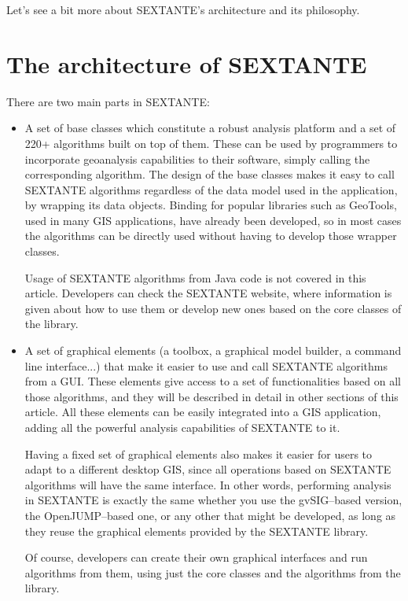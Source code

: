 \documentclass[12pt,a4paper,twocolumn]{article}
\begin{document}
Let's see a bit more about SEXTANTE's architecture and its philosophy.

\section{The architecture of SEXTANTE}

There are two main parts in SEXTANTE:

\begin{itemize}
 \item A set of base classes which constitute a robust analysis platform and a set of 220+ algorithms built on top of them. These can be used by programmers to incorporate geoanalysis capabilities to their software, simply calling the corresponding algorithm. The design of the base classes makes it easy to call SEXTANTE algorithms regardless of the data model used in the application, by wrapping its data objects. Binding for popular libraries such as GeoTools, used in many GIS applications, have already been developed, so in most cases the algorithms can be directly used without having to develop those wrapper classes.

Usage of SEXTANTE algorithms from Java code is not covered in this article. Developers can check the SEXTANTE website, where information is given about how to use them or develop new ones based on the core classes of the library.

\item A set of graphical elements (a toolbox, a graphical model builder, a command line interface...) that make it easier to use and call SEXTANTE algorithms from a GUI. These elements give access to a set of functionalities based on all those algorithms, and they will be described in detail in other sections of this article. All these elements can be easily integrated into a GIS application, adding all the powerful analysis capabilities of SEXTANTE to it. 

Having a fixed set of graphical elements also makes it easier for users to adapt to a different desktop GIS, since all operations based on SEXTANTE algorithms will have the same interface. In other words, performing analysis in SEXTANTE is exactly the same whether you use the gvSIG--based version, the OpenJUMP--based one, or any other that might be developed, as long as they reuse the graphical elements provided by the SEXTANTE library.

Of course, developers can create their own graphical interfaces and run algorithms from them, using just the core classes and the algorithms from the library. 
\end{itemize}
\end{document}
